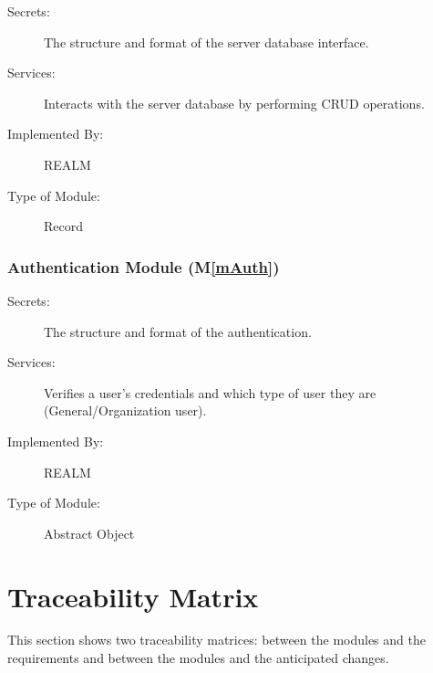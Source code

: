 \documentclass[12pt, titlepage]{article}
\newcommand{\mref}[1]{M\ref{#1}}
\begin{document}
\begin{description}
\item[Secrets:]The structure and format of the server database interface.
\item[Services:]Interacts with the server database by performing CRUD operations.
\item[Implemented By:]REALM
\item[Type of Module:]Record
\end{description}

\subsubsection{Authentication Module (\mref{mAuth})}

\begin{description}
\item[Secrets:]The structure and format of the authentication.
\item[Services:]Verifies a user's credentials and which type of user they are (General/Organization user).
\item[Implemented By:]REALM
\item[Type of Module:]Abstract Object
\end{description}

\newpage

\section{Traceability Matrix} \label{SecTM}

This section shows two traceability matrices: between the modules and the
requirements and between the modules and the anticipated changes.
\end{document}
